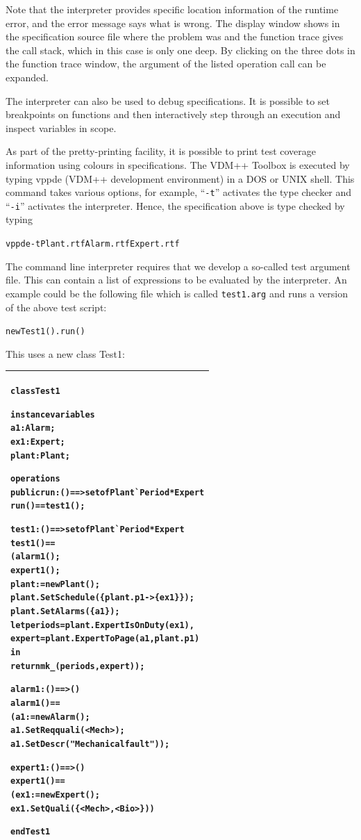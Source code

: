 \documentclass[\pformat,12pt,twoside]{article}
\newenvironment{VDMgray}%
{\begin{tabular}{|G|}\hline\small\begin{alltt}}%
{\end{alltt}\normalsize\\
 \hline\end{tabular}}
\begin{document}
Note that the interpreter provides specific location information 
of the runtime error, and the error message says what is wrong. 
The display window shows in the specification source file where 
the problem was and the function trace gives the call stack, 
which in this case is only one deep. By clicking on the three 
dots in the function trace window, the argument of the listed 
operation call can be expanded.

The interpreter can also be used to debug specifications. It 
is possible to set breakpoints on functions 
and then interactively step through an execution and inspect 
variables in scope.

As part of the pretty-printing facility, it is possible to print 
test coverage information using colours in specifications.
The VDM++ Toolbox is executed by typing vppde (VDM++ development 
environment) in a DOS or UNIX shell. This command takes various options, for example, 
``\texttt{-t}'' activates the type checker and ``\texttt{-i}'' activates the interpreter. 
Hence, the specification above is type checked by typing 

\small
\begin{alltt}
 vppde -t Plant.rtf Alarm.rtf Expert.rtf
\end{alltt}
\normalsize

The command line interpreter requires that we develop a so-called 
test argument file. This can contain a list of expressions to 
be evaluated by the interpreter. An example could be the following 
file which is called \texttt{test1.arg} and runs a version of the above 
test script:

\small
\begin{alltt}
 new Test1().run()
\end{alltt}
\normalsize

This uses a new class Test1:

\begin{VDMgray}
class Test1

instance variables
 a1 : Alarm;
 ex1 : Expert;
 plant : Plant;

operations
 public run: () ==\texttt{>} set of Plant\`{}Period * Expert
 run() == test1();

 test1: () ==\texttt{>} set of Plant\`{}Period * Expert
 test1() ==
   (alarm1();
    expert1();
    plant:= new Plant();
    plant.SetSchedule(\{plant.p1 {\textbar}-\texttt{>} \{ex1\}\});
    plant.SetAlarms(\{a1\});
    let periods = plant.ExpertIsOnDuty(ex1),
        expert = plant.ExpertToPage(a1,plant.p1)
    in 
      return mk\_(periods,expert));

 alarm1: () ==\texttt{>} ()
 alarm1() ==
   (a1:= new Alarm();
    a1.SetReqquali(\texttt{<}Mech\texttt{>});
    a1.SetDescr("Mechanical fault"));

 expert1: () ==\texttt{>} ()
 expert1() ==
   (ex1:= new Expert();
    ex1.SetQuali(\{\texttt{<}Mech\texttt{>},\texttt{<}Bio\texttt{>}\}))

end Test1
\end{VDMgray}
\end{document}
